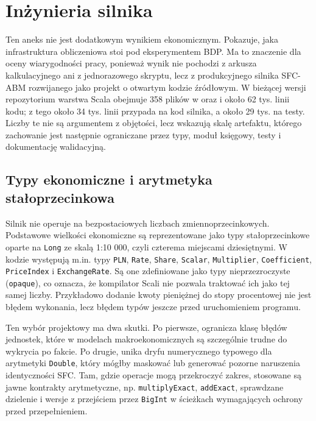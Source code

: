 \section{Inżynieria silnika \amor{}}
\label{app:engineering}

Ten aneks nie jest dodatkowym wynikiem ekonomicznym. Pokazuje, jaka infrastruktura obliczeniowa stoi pod eksperymentem BDP. Ma to znaczenie dla oceny wiarygodności pracy, ponieważ wynik nie pochodzi z arkusza kalkulacyjnego ani z jednorazowego skryptu, lecz z produkcyjnego silnika SFC-ABM rozwijanego jako projekt o otwartym kodzie źródłowym. W bieżącej wersji repozytorium \amor{} warstwa Scala obejmuje 358 plików w  oraz  i około 62 tys. linii kodu; z tego około 34 tys. linii przypada na kod silnika, a około 29 tys. na testy. Liczby te nie są argumentem z objętości, lecz wskazują skalę artefaktu, którego zachowanie jest następnie ograniczane przez typy, moduł księgowy, testy i dokumentację walidacyjną.

\subsection{Typy ekonomiczne i arytmetyka stałoprzecinkowa}

Silnik nie operuje na bezpostaciowych liczbach zmiennoprzecinkowych. Podstawowe wielkości ekonomiczne są reprezentowane jako typy stałoprzecinkowe oparte na \texttt{Long} ze skalą 1:10 000, czyli czterema miejscami dziesiętnymi. W kodzie występują m.in. typy \texttt{PLN}, \texttt{Rate}, \texttt{Share}, \texttt{Scalar}, \texttt{Multiplier}, \texttt{Coefficient}, \texttt{PriceIndex} i \texttt{ExchangeRate}. Są one zdefiniowane jako typy nieprzezroczyste (\texttt{opaque}), co oznacza, że kompilator Scali nie pozwala traktować ich jako tej samej liczby. Przykładowo dodanie kwoty pieniężnej do stopy procentowej nie jest błędem wykonania, lecz błędem typów jeszcze przed uruchomieniem programu.

Ten wybór projektowy ma dwa skutki. Po pierwsze, ogranicza klasę błędów jednostek, które w modelach makroekonomicznych są szczególnie trudne do wykrycia po fakcie. Po drugie, unika dryfu numerycznego typowego dla arytmetyki \texttt{Double}, który mógłby maskować lub generować pozorne naruszenia identyczności SFC. Tam, gdzie operacje mogą przekroczyć zakres, stosowane są jawne kontrakty arytmetyczne, np. \texttt{multiplyExact}, \texttt{addExact}, sprawdzane dzielenie i wersje z przejściem przez \texttt{BigInt} w ścieżkach wymagających ochrony przed przepełnieniem.

